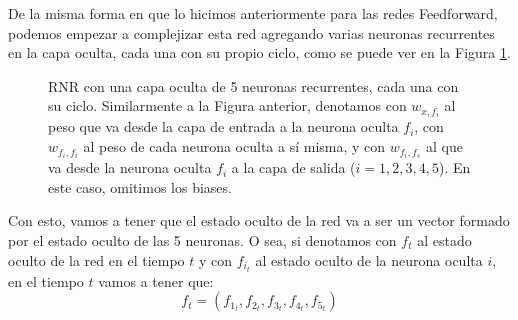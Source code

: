 \documentclass[../../main.tex]{subfiles}
\begin{document}
De la misma forma en que lo hicimos anteriormente para las redes Feedforward, podemos
empezar a complejizar esta red agregando varias neuronas recurrentes en la capa oculta,
cada una con su propio ciclo, como se puede ver en la Figura \ref{fig:simple-rnn-2}.
\begin{figure}[ht]
    \centering
    \caption{RNR con una capa oculta de 5 neuronas recurrentes, cada una con su ciclo.
    Similarmente a la Figura anterior, denotamos con \(w_{x,f_i}\) al peso que va desde la
    capa de entrada a la neurona oculta \(f_i\), con \(w_{f_i, f_i}\) al peso de cada
    neurona oculta a sí misma, y con \(w_{f_i, f_s}\) al que va desde la neurona oculta
    \(f_i\) a la capa de salida (\(i=1,2,3,4,5\)). En este caso, omitimos los biases.}
    \label{fig:simple-rnn-2}
\end{figure}

Con esto, vamos a tener que el estado oculto de la red va a ser un vector formado por el
estado oculto de las 5 neuronas. O sea, si denotamos con \(f_t\) al estado oculto
de la red en el tiempo \(t\) y con \(f_{i_t}\) al estado oculto de la neurona oculta
\(i\), en el tiempo \(t\) vamos a tener que:
\begin{equation*}
    f_t = (f_{1_t}, f_{2_t}, f_{3_t}, f_{4_t}, f_{5_t})
\end{equation*}
\end{document}

